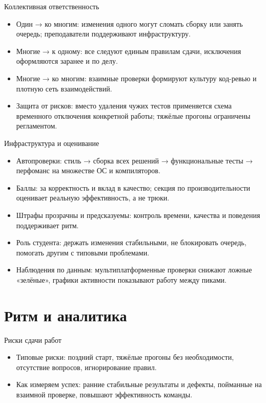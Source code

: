 \documentclass{beamer}
\begin{document}
\begin{frame}{Коллективная ответственность}
  \begin{itemize}
    \item Один → ко многим: изменения одного могут сломать сборку или занять очередь; преподаватели поддерживают инфраструктуру.
    \item Многие → к одному: все следуют единым правилам сдачи, исключения оформляются заранее и по делу.
    \item Многие → ко многим: взаимные проверки формируют культуру код-ревью и плотную сеть взаимодействий.
    \item Защита от рисков: вместо удаления чужих тестов применяется схема временного отключения конкретной работы; тяжёлые прогоны ограничены регламентом.
  \end{itemize}
\end{frame}

\begin{frame}{Инфраструктура и оценивание}
  \begin{itemize}
    \item Автопроверки: стиль → сборка всех решений → функциональные тесты → перфоманс на множестве ОС и компиляторов.
    \item Баллы: за корректность и вклад в качество; секция по производительности оценивает реальную эффективность, а не трюки.
    \item Штрафы прозрачны и предсказуемы: контроль времени, качества и поведения поддерживает ритм.
    \item Роль студента: держать изменения стабильными, не блокировать очередь, помогать другим с типовыми проблемами.
    \item Наблюдения по данным: мультиплатформенные проверки снижают ложные «зелёные», графики активности показывают работу между пиками.
  \end{itemize}
\end{frame}

\section{Ритм и аналитика}

\begin{frame}{Риски сдачи работ}
  \begin{itemize}
    \item Типовые риски: поздний старт, тяжёлые прогоны без необходимости, отсутствие вопросов, игнорирование правил.
    \item Как измеряем успех: ранние стабильные результаты и дефекты, пойманные на взаимной проверке, повышают эффективность команды.
  \end{itemize}
\end{frame}
\end{document}

